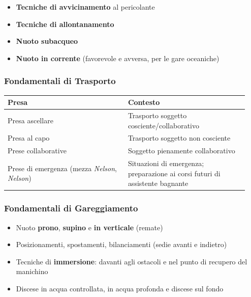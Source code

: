 \documentclass[a4paper,11pt]{article}
\providecommand{\tightlist}{%
  \setlength{\itemsep}{0pt}\setlength{\parskip}{0pt}}
\begin{document}
\begin{itemize}
      \tightlist
      \item
            \textbf{Tecniche di avvicinamento} al pericolante
      \item
            \textbf{Tecniche di allontanamento}
      \item
            \textbf{Nuoto subacqueo}
      \item
            \textbf{Nuoto in corrente} (favorevole e avversa, per le gare
            oceaniche)
\end{itemize}

\subsubsection{Fondamentali di
      Trasporto}\label{fondamentali-di-trasporto}

\begin{longtable}[]{@{}p{0.47\linewidth}p{0.47\linewidth}@{}}
      \toprule\noalign{}
      Presa                                                   & Contesto                                   \\
      \midrule\noalign{}
      \endhead
      \bottomrule\noalign{}
      \endlastfoot
      Presa ascellare                                         & Trasporto soggetto cosciente/collaborativo \\
      Presa al capo                                           & Trasporto soggetto non cosciente           \\
      Prese collaborative                                     & Soggetto pienamente collaborativo          \\
      Prese di emergenza (mezza \emph{Nelson}, \emph{Nelson}) & Situazioni di
      emergenza; preparazione ai corsi futuri di assistente bagnante                                       \\
\end{longtable}

\subsubsection{Fondamentali di
      Gareggiamento}\label{fondamentali-di-gareggiamento}

\begin{itemize}
      \tightlist
      \item
            Nuoto \textbf{prono}, \textbf{supino} e \textbf{in verticale} (remate)
      \item
            Posizionamenti, spostamenti, bilanciamenti (sedie avanti e indietro)
      \item
            Tecniche di \textbf{immersione}: davanti agli ostacoli e nel punto di
            recupero del manichino
      \item
            Discese in acqua controllata, in acqua profonda e discese sul fondo
\end{itemize}
\end{document}
